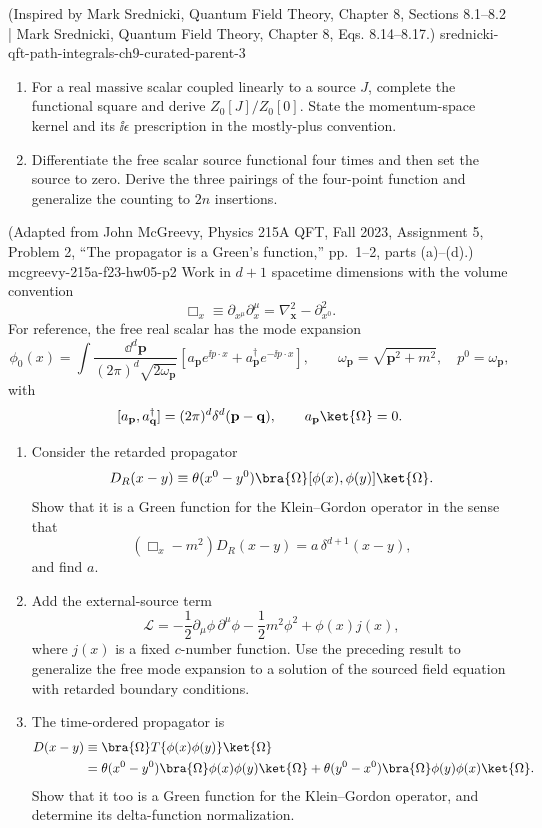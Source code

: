 \begin{enumerate}
  {(Inspired by Mark Srednicki, Quantum Field Theory, Chapter 8, Sections 8.1--8.2 | Mark Srednicki, Quantum Field Theory, Chapter 8, Eqs. 8.14--8.17.)}
  {srednicki-qft-path-integrals-ch9-curated-parent-3}
\begin{enumerate}
\item
For a real massive scalar coupled linearly to a source \(J\), complete the
functional square and derive \(Z_0[J]/Z_0[0]\).  State the momentum-space
kernel and its \(\ii\epsilon\) prescription in the mostly-plus convention.
\item
Differentiate the free scalar source functional four times and then set
the source to zero.  Derive the three pairings of the four-point function
and generalize the counting to \(2n\) insertions.
\end{enumerate}

  {(Adapted from John McGreevy, Physics 215A QFT, Fall 2023, Assignment 5,
  Problem 2, ``The propagator is a Green's function,'' pp.~1--2,
  parts (a)--(d).)}
  {mcgreevy-215a-f23-hw05-p2}
Work in \(d+1\) spacetime dimensions with the volume convention
\[
 \Box_x\equiv\partial_{x^\mu}\partial_x^{\mu}
 =\nabla_{\mathbf x}^2-\partial_{x^0}^2.
\]
For reference, the free real scalar has the mode expansion
\[
 \phi_0(x)=\int\frac{\dd^d\mathbf p}{(2\pi)^d\sqrt{2\omega_{\mathbf p}}}
 \left[a_{\mathbf p}e^{\ii p\cdot x}
 +a_{\mathbf p}^\dagger e^{-\ii p\cdot x}\right],
 \qquad \omega_{\mathbf p}=\sqrt{\mathbf p^2+m^2},\quad p^0=\omega_{\mathbf p},
\]
with
\[
 [a_{\mathbf p},a_{\mathbf q}^\dagger]
 =(2\pi)^d\delta^d(\mathbf p-\mathbf q),
 \qquad a_{\mathbf p}\ket{\Omega}=0.
\]
\begin{enumerate}
\item
Consider the retarded propagator
\[
 D_R(x-y)\equiv\theta(x^0-y^0)
 \bra{\Omega}[\phi(x),\phi(y)]\ket{\Omega}.
\]
Show that it is a Green function for the Klein--Gordon operator in the
sense that
\[
 (\Box_x-m^2)D_R(x-y)=a\,\delta^{d+1}(x-y),
\]
and find \(a\).
\item
Add the external-source term
\[
 \mathcal L= -\frac12\partial_\mu\phi\,\partial^\mu\phi
 -\frac12m^2\phi^2+\phi(x)j(x),
\]
where \(j(x)\) is a fixed \(c\)-number function.  Use the preceding result to
generalize the free mode expansion to a solution of the sourced field
equation with retarded boundary conditions.
\item
The time-ordered propagator is
\[
\begin{split}
 D(x-y)&\equiv
 \bra{\Omega}T\{\phi(x)\phi(y)\}\ket{\Omega}\\
 &=\theta(x^0-y^0)\bra{\Omega}\phi(x)\phi(y)\ket{\Omega}
 +\theta(y^0-x^0)\bra{\Omega}\phi(y)\phi(x)\ket{\Omega}.
\end{split}
\]
Show that it too is a Green function for the Klein--Gordon operator, and
determine its delta-function normalization.


\end{enumerate}
\end{enumerate}
